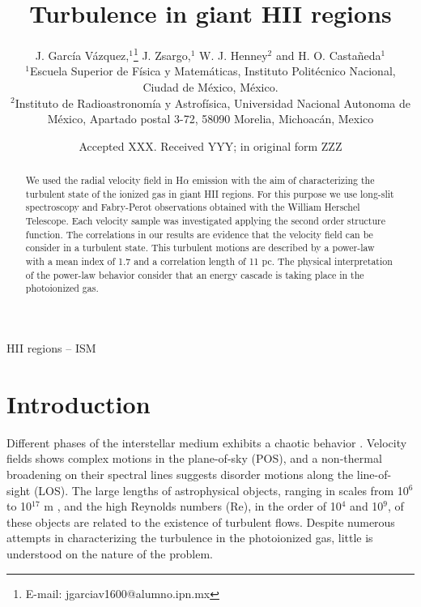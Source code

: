 \documentclass[fleqn,usenatbib]{mnras}
\title[Turbulence in GHRs]{Turbulence in giant HII regions}
\author[J. García-Vázquez et al.]{
J. García Vázquez,$^{1}$\thanks{E-mail: jgarciav1600@alumno.ipn.mx}
J. Zsargo,$^{1}$
W. J. Henney$^{2}$
and H. O. Castañeda$^{1}$
\\
$^{1}$Escuela Superior de Física y Matemáticas, Instituto Politécnico Nacional, Ciudad de México, México.\\
$^{2}$Instituto de Radioastronomía y Astrofísica, Universidad Nacional Autonoma de México, Apartado postal 3-72, 58090 Morelia, Michoacán, Mexico\\
}
\date{Accepted XXX. Received YYY; in original form ZZZ}
\begin{document}
\label{firstpage}
\pagerange{\pageref{firstpage}--\pageref{lastpage}}
\maketitle

\begin{abstract}

We used the radial velocity field in H$\alpha$ emission with the aim of characterizing the turbulent state of the ionized gas in giant HII regions. For this purpose we use long-slit spectroscopy and Fabry-Perot observations obtained with the William Herschel Telescope. Each velocity sample was investigated applying the second order structure function. The correlations in our results are evidence that the velocity field can be consider in a turbulent state. This turbulent motions are described by a power-law with a mean index of 1.7 and a correlation length of 11 pc. The physical interpretation of the power-law behavior consider that an energy cascade is taking place in the photoionized gas.
\end{abstract}

\begin{keywords}
HII regions -- ISM
\end{keywords}



\section{Introduction}

Different phases of the interstellar medium exhibits a chaotic behavior \citep{franco1999interstellar,elmegreen2004interstellar,scalo2004interstellar}. Velocity fields shows complex motions in the plane-of-sky (POS), and a non-thermal broadening on their spectral lines suggests disorder motions along the line-of-sight (LOS). The large lengths of astrophysical objects, ranging in scales from 10$^{6}$ to 10$^{17}$ m \citep{chepurnov2010extending}, and the high Reynolds numbers (Re), in the order of 10$^{4}$ and 10$^{9}$, of these objects \citep{lagrois2011} are related to the existence of turbulent flows. Despite numerous attempts in characterizing the turbulence in the photoionized gas, little is understood on the nature of the problem.   
\end{document}
